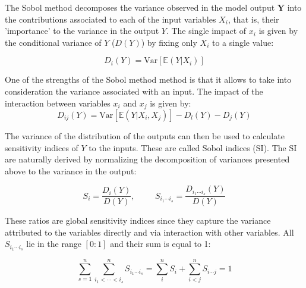 \documentclass[12pt]{article}
\begin{document}
{The Sobol method decomposes the variance observed in the model output $\mathbf{Y}$ into the contributions associated to each of the input variables ${X_{i}}$, that is, their 'importance' to the variance in the output $Y$. %
The single impact of $x_{i}$ is given by the conditional variance of $Y$ ($D(Y)$) by fixing only $X_{i}$ to a single value:

\begin{equation}
D_{i}(Y)=\text{Var}[\mathbb{E}(Y|X_{i})]
\end{equation}


One of the strengths of the Sobol method method is that it allows to take into consideration the variance associated with an input. The impact of the interaction between variables $x_{i}$ and $x_{j}$ is given by:
\begin{equation}
D_{ij}(Y)=\text{Var}[\mathbb{E}(Y|X_{i},X_{j})]-D_{l}(Y)-D_{j}(Y)
\end{equation}

The variance of the distribution of the outputs can then be used to calculate sensitivity indices of $Y$ to the inputs. These are called Sobol indices (SI). The SI are naturally derived by normalizing the decomposition of variances presented above to the variance in the output:

\begin{equation}
	S_{i}=\frac{D_{i}(Y)}{D(Y)} , \hspace{1cm} S_{i_{1}\cdots i_{s}}=\frac{D_{i_{1}\cdots i_{s}}(Y)}{D(Y)} 
\end{equation}

These ratios are  global sensitivity indices since they capture the variance attributed to the variables directly and via interaction with other variables. All $S_{i_{1}\cdots i_{s}}$ lie in the range $[0:1]$ and their sum is equal to 1:

\begin{equation}
	\sum^{n}_{s=1}\sum^{n}_{i_{1}<\cdots<i_{s}}S_{i_{1}\cdots i_{s}}=\sum^{n}_{i}S_{i}+\sum^{n}_{i<j}S_{i\cdots j}=1
\end{equation}

}
\end{document}
